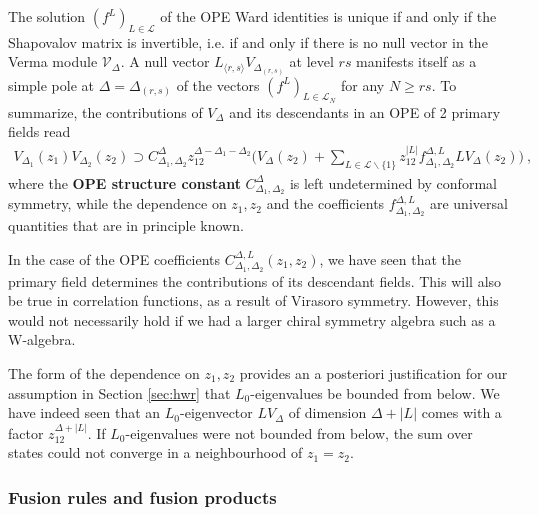 \documentclass[12pt, a4paper]{article}
\newcommand{\myindex}[1]{\textbf{\boldmath #1}}
\begin{document}
The solution $\left(f^L\right)_{L\in\mathcal{L}}$ of the OPE Ward identities is unique if and only if the Shapovalov matrix is invertible, i.e. if and only if there is no null vector in the Verma module $\mathcal{V}_\Delta$. A null vector $L_{\langle r,s\rangle} V_{\Delta_{(r,s)}}$ at level $rs$ manifests itself as a simple pole at $\Delta=\Delta_{(r,s)}$ of the vectors $(f^L)_{L\in\mathcal{L}_N}$ for any $N\geq rs$.
To summarize, the contributions of $V_\Delta$ and its descendants in an OPE of 2 primary fields read
\begin{align}
 \boxed{V_{\Delta_1}(z_1)V_{\Delta_2}(z_2) \supset  C_{\Delta_1,\Delta_2}^{\Delta} z_{12}^{\Delta-\Delta_1-\Delta_2} \Bigg(V_\Delta(z_2) +\sum_{L\in \mathcal{L}\backslash\{1\}}z_{12}^{|L|} f^{\Delta,L}_{\Delta_1,\Delta_2} LV_\Delta(z_2)\Bigg)}
 \ ,
 \label{prope}
\end{align}
where the \myindex{OPE structure constant} $C^\Delta_{\Delta_1,\Delta_2}$ is left undetermined by conformal symmetry, while the dependence on $z_1,z_2$ and the coefficients $f^{\Delta,L}_{\Delta_1,\Delta_2}$ are universal quantities that are in principle known. 

In the case of the OPE coefficients $C^{\Delta,L}_{\Delta_1,\Delta_2}(z_1,z_2)$, we have seen that the primary field determines the contributions of its descendant fields. This will also be true in correlation functions, as a result of Virasoro symmetry. However, this would not necessarily hold if we had a larger chiral symmetry algebra such as a W-algebra. 

The form of the dependence on $z_1,z_2$ provides an a posteriori justification for our assumption in Section \ref{sec:hwr} that $L_0$-eigenvalues be bounded from below. We have indeed seen that an $L_0$-eigenvector $LV_\Delta$ of dimension $\Delta+|L|$ comes with a factor $z_{12}^{\Delta+|L|}$. If $L_0$-eigenvalues were not bounded from below, the sum over states could not converge in a neighbourhood of $z_1=z_2$. 


\subsubsection{Fusion rules and fusion products}\label{sec:dope}
\end{document}

